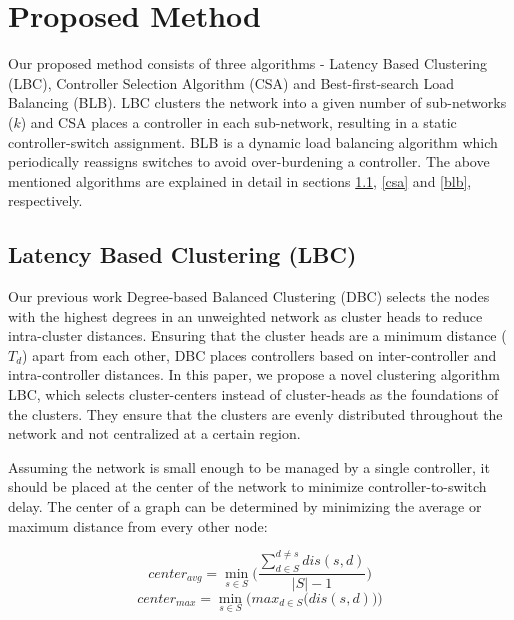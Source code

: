 \documentclass[preprint,12pt]{elsarticle}
\begin{document}
	\section{Proposed Method} \label{proposal}
	
	Our proposed method consists of three algorithms - Latency Based Clustering (LBC), Controller Selection Algorithm (CSA) and Best-first-search Load Balancing (BLB). LBC clusters the network into a given number of sub-networks ($k$) and CSA places a controller in each sub-network, resulting in a static controller-switch assignment. BLB is a dynamic load balancing algorithm which periodically reassigns switches to avoid over-burdening a controller. The above mentioned algorithms are explained in detail in sections \ref{lbc}, \ref{csa} and \ref{blb}, respectively.
	
	\subsection{Latency Based Clustering (LBC)} \label{lbc}
	
	Our previous work Degree-based Balanced Clustering (DBC) \cite{aziz2019degree} selects the nodes with the highest degrees in an unweighted network as cluster heads to reduce intra-cluster distances. Ensuring that the cluster heads are a minimum distance ($T_d$) apart from each other, DBC places controllers based on inter-controller and intra-controller distances. In this paper, we propose a novel clustering algorithm LBC, which selects cluster-centers instead of cluster-heads as the foundations of the clusters. They ensure that the clusters are evenly distributed throughout the network and not centralized at a certain region.
	
	Assuming the network is small enough to be managed by a single controller, it should be placed at the center of the network to minimize controller-to-switch delay. The center of a graph \cite{wilson1979introduction} can be determined by minimizing the average or maximum distance from every other node:
	
	\begin{equation} \label{eqn:avgDis}
	center_{avg} = \min_{s\in S}\bigg(\frac{\sum_{d\in S}^{d\ne s}dis(s,d)}{|S|-1}\bigg)
	\end{equation}
	\begin{equation} \label{eqn:maxDis}
	center_{max} = \min_{s\in S}\bigg(max_{d\in S}\big(dis(s,d)\big)\bigg)
	\end{equation}
	
\end{document}
